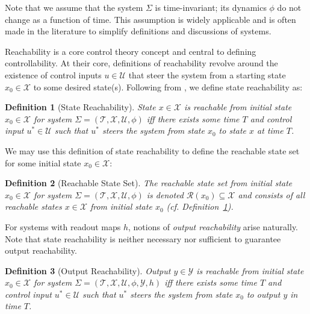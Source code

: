 \documentclass{article} %
\newtheorem{definition}{Definition}
\begin{document}
Note that we assume that the system $\Sigma$ is time-invariant; its dynamics $\phi$ do not change as a function of time. This assumption is widely applicable and is often made in the literature \citep{kalman1969topics, ogata2010modern, control_bible} to simplify definitions and discussions of systems. 


Reachability is a core control theory concept and central to defining controllability. At their core, definitions of reachability revolve around the existence of control inputs $u\in \mathcal U$ that steer the system from a starting state $x_0 \in \mathcal X$ to some desired state(s). Following from \cite{kalman1969topics, control_bible}, we define state reachability as: 

\begin{definition}[State Reachability]
\label{def:state-reachability}
State $x \in \mathcal X$ is reachable from initial state $x_0\in \mathcal X$ for system $\Sigma=(\mathcal{T, X, U}, \phi)$ iff there exists some time $T$ and control input $u^* \in \mathcal U$ such that $u^*$ steers the system from state $x_0$ to state $x$ at time $T$.
\end{definition}

We may use this definition of state reachability to define the reachable state set for some initial state $x_0 \in \mathcal X$:

\begin{definition}[Reachable State Set]
\label{def:reachable-state-set} 
The reachable state set from initial state $x_0 \in \mathcal X$ for system $\Sigma = (\mathcal {T, X, U}, \phi)$ is denoted $\mathcal R(x_0) \subseteq \mathcal X$ and consists of all reachable states $x\in \mathcal X$ from initial state $x_0$ (cf. Definition~\ref{def:state-reachability}). 
\end{definition} 


For systems with readout maps $h$, notions of \textit{output reachability} arise naturally. Note that state reachability is neither necessary nor sufficient to guarantee output reachability. 

\begin{definition}[Output Reachability]
\label{def:output-reachability}
Output $y \in \mathcal Y$ is reachable from initial state $x_0 \in \mathcal X$ for system $\Sigma=(\mathcal{T, X, U}, \phi, \mathcal Y, h)$ iff there exists some time $T$ and control input $u^* \in \mathcal U$ such that $u^*$ steers the system from state $x_0$ to output $y$ in time $T$. 
\end{definition}
\end{document}
